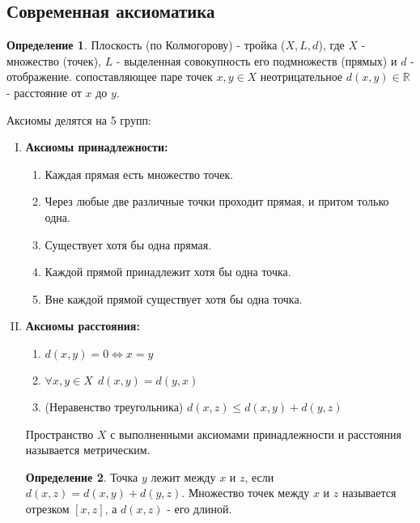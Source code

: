 \documentclass[a4paper, 12pt]{article}
\theoremstyle{definition}
\newtheorem*{definition}{Определение}
\begin{document}
	\subsection{Современная аксиоматика}
	\begin{definition}
		Плоскость (по Колмогорову) - тройка ($X, L, d$), где $X$ - множество (точек), $L$ - выделенная совокупность его подмножеств (прямых) и $d$ - отображение. сопоставляющее паре точек $x, y\in X$ неотрицательное $d(x, y) \in \mathbb{R}$ - расстояние от $x$ до $y$. 
	\end{definition} 
	Аксиомы делятся на 5 групп:
	\begin{enumerate}[I.]
		\item \bfseries Аксиомы принадлежности: \mdseries
		\begin{enumerate}[1.]
			\item Каждая прямая есть множество точек.
			\item Через любые две различные точки проходит прямая, и притом только одна.
			\item Существует хотя бы одна прямая.
		    \item Каждой прямой принадлежит хотя бы одна точка.
		    \item Вне каждой прямой существует хотя бы одна точка.
		\end{enumerate}
		\item \bfseries Аксиомы расстояния: \mdseries
		\begin{enumerate}[1.]
			\item $d(x, y) = 0 \Leftrightarrow x = y$
			\item $\forall x,y\in X \ \ d(x, y) = d(y, x)$
			\item (Неравенство треугольника) $d(x, z) \leqslant d(x, y) + d(y, z)$ 
		\end{enumerate}
		Пространство $X$ с выполненными аксиомами принадлежности и расстояния называется метрическим.
		\begin{definition}
			Точка $y$ лежит между $x$ и $z$, если $d(x, z) = d(x, y) + d(y, z)$. Множество точек между $x$ и $z$ называется отрезком $[x, z]$, а $d(x, z)$ - его длиной. 
		\end{definition}
		

\end{enumerate}
\end{document}
